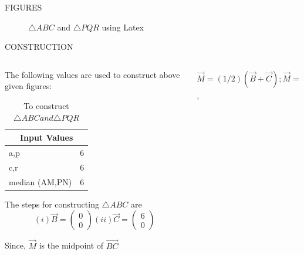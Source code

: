 \documentclass[11pt]{beamer}
\begin{document}
\begin{frame}{FIGURES}
\begin{figure}
\resizebox{10cm}{!}{}
\caption{$\triangle ABC$ and $\triangle PQR$ using Latex}
\end{figure}
\end{frame}

\begin{frame}{CONSTRUCTION}
\begin{columns}
\begin{column}{0.5\textwidth}
The following values are used to construct above given figures:
\begin{table}[htbp]
\centering
\resizebox{0.5\textwidth}{!}
{\begin{minipage}{\textwidth}
\begin{tabular}{ |p{3cm}|p{3cm}|  }
\hline
 \multicolumn{2}{|c|}{Input Values} \\
\hline
a,p & 6\\
\hline
c,r & 6\\
\hline
median (AM,PN) & 6 \\
\hline
\end{tabular}
\end{minipage}}
\caption{\tiny To construct $\triangle ABC and \triangle PQR $}
\end{table}



The steps for constructing $\triangle ABC$ are
\newline
$$(i)\vec{B}= \begin{pmatrix}0\\0\end{pmatrix}
(ii)\vec{C}=\begin{pmatrix}6\\0\end{pmatrix}$$

Since, $\vec{M}$ is the midpoint of $\vec{BC}$
\end{column}
\begin{column}{0.5\textwidth}
$$\vec{M}=(1/2)(\vec{B}+\vec{C});
\vec{M}=\begin{pmatrix}3\\0\end{pmatrix}$$,


\end{column}
\end{columns}
\end{frame}
\end{document}
